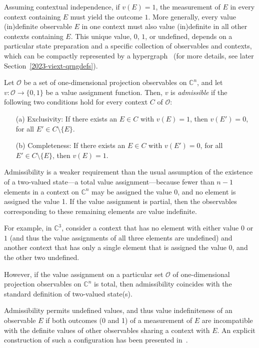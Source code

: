 \documentclass[%
 superscriptaddress,
  preprint,
 showpacs,
 showkeys,
 nofootinbib,
  amsmath,amssymb,
  aps,
 pra,
  longbibliography,
  floatfix,
 ]{revtex4-2}
\theoremstyle{definition}
\newcommand{\C}{\mathbb{C}}
\begin{document}
Assuming contextual independence, if  $v(E)=1$, the measurement of $E$ in every context containing $E$ must yield the outcome  $1$.
More generally, every value (in)definite observable $E$ in one context must also value (in)definite in all other contexts containing $E$.
This unique value, $0$, $1$, or undefined, depends on a particular state preparation and a specific collection of observables and contexts, which can be compactly represented by a hypergraph~\cite{greechie:71,Bretto-MR3077516} (for more details, see later Section~\ref{2023-viext-qrngdefs}).


Let $\mathcal{O}$ be a set of one-dimensional projection observables on $\C^n$, and let $v:\mathcal{O}\to\{0,1\}$ be a value assignment function.
Then, $v$ is {\it admissible} if the following two conditions hold for every context $C$ of $\mathcal{O}$:
        \begin{itemize}
                \item[(a)] Exclusivity: If there exists an $E\in C$ with $v(E)=1$, then $v(E')=0$, for all $E'\in C\setminus\{E\}$.
                \item[(b)] Completeness:                  If there exists an $E\in C$ with $v(E')=0$,   for all $E'\in C\setminus\{E\}$, then $v(E)=1$.
        \end{itemize}




Admissibility is a weaker requirement than the usual assumption of the existence
of a two-valued state---a total value assignment---because fewer than $n-1$ elements in a context on $\C^n$ may be assigned the value 0, and no element is assigned the value 1. If the value assignment is partial, then the observables corresponding to these remaining elements are value indefinite.

For example, in $\C^3$, consider a  context that has no element with either value $0$ or $1$ (and thus the value assignments of all three elements are undefined) and another context that has only a single element that is assigned the value $0$, and the other two undefined.

However, if the value assignment on a particular set $\mathcal{O}$ of one-dimensional projection observables on $\C^n$ is total,
then admissibility coincides with the standard definition of two-valued state(s).


Admissibility permits undefined values, and thus value indefiniteness of an observable $E$ if both outcomes (0 and 1) of a measurement of $E$
are incompatible with the definite values of other observables sharing a context with $E$.
An explicit construction of such a configuration has been presented in~\cite{2015-AnalyticKS}.
\end{document}
